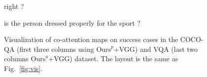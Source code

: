 \documentclass{article}
\def \fsize {1pt}
\begin{document}
\begin{figure}[p]
\begin{minipage}{0.19\linewidth}
\begin{center}
{\textcolor[rgb]{0.5914,1.0000,0.3763}{right}
\textcolor[rgb]{0.5534,1.0000,0.4143}{?}
}	
\end{center}
\end{minipage}
\begin{minipage}{0.19\linewidth}
\begin{center}
\tiny{
\setlength{\fboxsep}{\fsize}
\textcolor[rgb]{0.0000,0.0000,0.5713}{is}
\textcolor[rgb]{0.0000,0.0000,0.5535}{the}
\textcolor[rgb]{0.0000,0.0000,0.5535}{person}
\textcolor[rgb]{0.0000,0.0000,0.5713}{dressed}
\textcolor[rgb]{0.0000,0.0000,0.7852}{properly}
\textcolor[rgb]{0.0000,0.0000,1.0000}{for}
\textcolor[rgb]{0.0000,0.0490,1.0000}{the}
\textcolor[rgb]{0.0980,1.0000,0.8697}{sport}
\textcolor[rgb]{0.9278,0.0153,0.0000}{?}
}	
\end{center}   
\end{minipage}
\caption{Visualization of co-attention maps on success cases in the COCO-QA (first three columns using $\mathrm{Ours}^p$+VGG) and VQA (last two columns $\mathrm{Ours}^a$+VGG) dataset. The layout is the same as Fig.~\ref{fig:vis}.}
\label{fig:vis2}
\end{figure}
\end{document}
